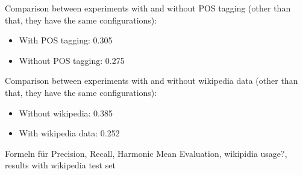 Comparison between experiments with and without POS tagging (other than that, they have the same configurations):
\begin{itemize}
\item With POS tagging: 0.305
\item Without POS tagging: 0.275
\end{itemize}

Comparison between experiments with and without wikipedia data (other than that, they have the same configurations):
\begin{itemize}
\item Without wikipedia: 0.385
\item With wikipedia data: 0.252
\end{itemize}


Formeln für Precision, Recall, Harmonic Mean
Evaluation, wikipidia usage?, results with wikipedia test set
